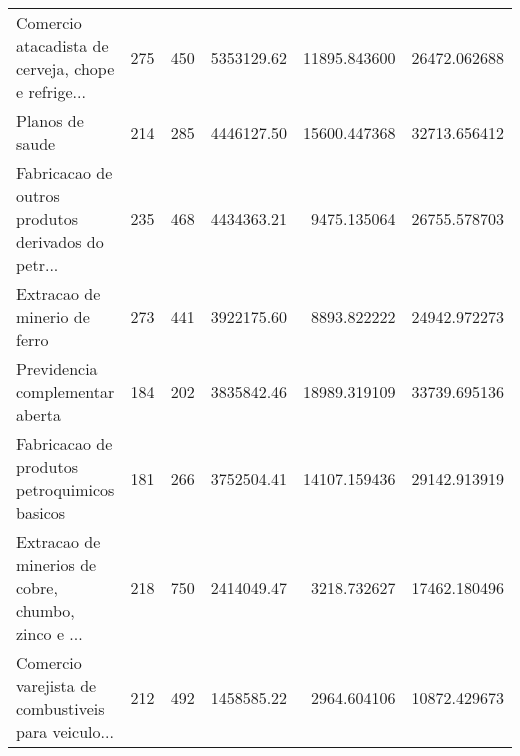 \begin{tabular}{lrrrrr}
Comercio atacadista de cerveja, chope e refrige... &                   275 &                  450 &   5353129.62 & 11895.843600 &              26472.062688 \\
                                   Planos de saude &                   214 &                  285 &   4446127.50 & 15600.447368 &              32713.656412 \\
Fabricacao de outros produtos derivados do petr... &                   235 &                  468 &   4434363.21 &  9475.135064 &              26755.578703 \\
                      Extracao de minerio de ferro &                   273 &                  441 &   3922175.60 &  8893.822222 &              24942.972273 \\
                   Previdencia complementar aberta &                   184 &                  202 &   3835842.46 & 18989.319109 &              33739.695136 \\
      Fabricacao de produtos petroquimicos basicos &                   181 &                  266 &   3752504.41 & 14107.159436 &              29142.913919 \\
Extracao de minerios de cobre, chumbo, zinco e ... &                   218 &                  750 &   2414049.47 &  3218.732627 &              17462.180496 \\
Comercio varejista de combustiveis para veiculo... &                   212 &                  492 &   1458585.22 &  2964.604106 &              10872.429673 \\
\bottomrule
\end{tabular}
